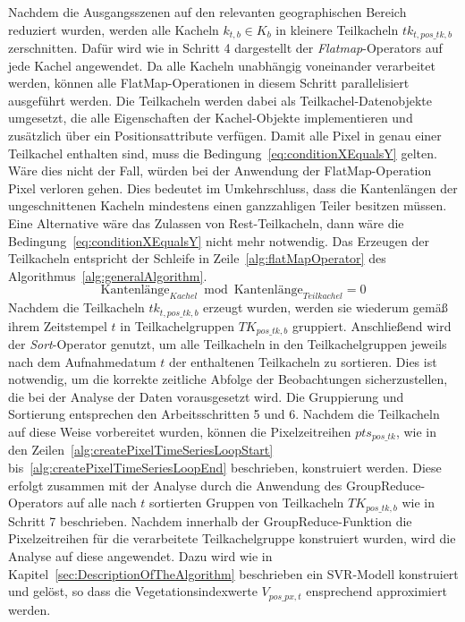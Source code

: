 Nachdem die Ausgangsszenen auf den relevanten geographischen Bereich reduziert wurden, werden alle Kacheln $k_{t, b} \in K_{b}$ in kleinere Teilkacheln $tk_{t, pos\_tk, b}$ zerschnitten. Dafür wird wie in Schritt 4 dargestellt der \textit{Flatmap}-Operators auf jede Kachel angewendet. Da alle Kacheln unabhängig voneinander verarbeitet werden, können alle FlatMap-Operationen in diesem Schritt parallelisiert ausgeführt werden. Die Teilkacheln werden dabei als Teilkachel-Datenobjekte umgesetzt, die alle Eigenschaften der Kachel-Objekte implementieren und zusätzlich über ein Positionsattribute verfügen. Damit alle Pixel in genau einer Teilkachel enthalten sind, muss die Bedingung~\ref{eq:conditionXEqualsY} gelten. Wäre dies nicht der Fall, würden bei der Anwendung der FlatMap-Operation Pixel verloren gehen. Dies bedeutet im Umkehrschluss, dass die Kantenlängen der ungeschnittenen Kacheln mindestens einen ganzzahligen Teiler besitzen müssen. Eine Alternative wäre das Zulassen von Rest-Teilkacheln, dann wäre die Bedingung~\ref{eq:conditionXEqualsY} nicht mehr notwendig. Das Erzeugen der Teilkacheln entspricht der Schleife in Zeile~\ref{alg:flatMapOperator} des Algorithmus~\ref{alg:generalAlgorithm}.
%
\begin{equation} \label{eq:conditionXEqualsY}
\text{Kantenlänge}_{Kachel} \bmod \text{Kantenlänge}_{Teilkachel} = 0
\end{equation}
%
Nachdem die Teilkacheln $tk_{t, pos\_tk, b}$ erzeugt wurden, werden sie wiederum gemäß ihrem Zeitstempel $t$ in Teilkachelgruppen $TK_{pos\_tk, b}$ gruppiert. Anschließend wird der \textit{Sort}-Operator genutzt, um alle Teilkacheln in den Teilkachelgruppen jeweils nach dem Aufnahmedatum $t$ der enthaltenen Teilkacheln zu sortieren. Dies ist notwendig, um die korrekte zeitliche Abfolge der Beobachtungen sicherzustellen, die bei der Analyse der Daten vorausgesetzt wird. Die Gruppierung und Sortierung entsprechen den Arbeitsschritten 5 und 6.
Nachdem die Teilkacheln auf diese Weise vorbereitet wurden, können die Pixelzeitreihen $pts_{pos\_tk}$, wie in den Zeilen~\ref{alg:createPixelTimeSeriesLoopStart} bis~\ref{alg:createPixelTimeSeriesLoopEnd} beschrieben, konstruiert werden. 
Diese erfolgt zusammen mit der Analyse durch die Anwendung des GroupReduce-Operators auf alle nach $t$ sortierten Gruppen von Teilkacheln $TK_{pos\_tk, b}$ wie in Schritt 7 beschrieben. Nachdem innerhalb der GroupReduce-Funktion die Pixelzeitreihen für die verarbeitete Teilkachelgruppe konstruiert wurden, wird die Analyse auf diese angewendet. Dazu wird wie in Kapitel~\ref{sec:DescriptionOfTheAlgorithm} beschrieben ein SVR-Modell konstruiert und gelöst, so dass die Vegetationsindexwerte $V_{pos\_px, t}$ ensprechend approximiert werden. 

